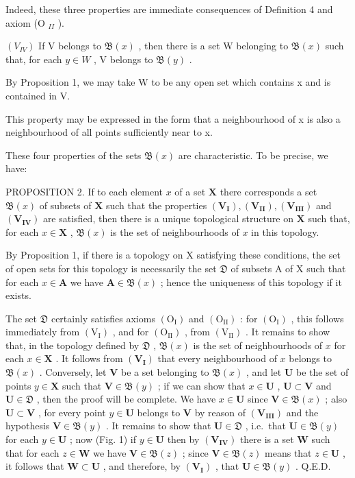 Indeed, these three properties are immediate consequences of Definition 4 and axiom (O \(_{II}\) ).

\((V_{IV})\) If V belongs to \(\mathfrak{B}(x)\) , then there is a set W belonging to \(\mathfrak{B}(x)\) such that, for each \(y \in W\) , V belongs to \(\mathfrak{B}(y)\) .

By Proposition 1, we may take W to be any open set which contains x and is contained in V.

This property may be expressed in the form that a neighbourhood of x is also a neighbourhood of all points sufficiently near to x.

These four properties of the sets \(\mathfrak{B}(x)\) are characteristic. To be precise, we have:

PROPOSITION 2. If to each element \(x\) of a set \(\mathbf{X}\) there corresponds a set \(\mathfrak{B}(x)\) of subsets of \(\mathbf{X}\) such that the properties \((\mathbf{V}_{\mathbf{I}}), (\mathbf{V}_{\mathbf{II}}), (\mathbf{V}_{\mathbf{III}})\) and \((\mathbf{V}_{\mathbf{IV}})\) are satisfied, then there is a unique topological structure on \(\mathbf{X}\) such that, for each \(x \in \mathbf{X}\) , \(\mathfrak{B}(x)\) is the set of neighbourhoods of \(x\) in this topology.

By Proposition 1, if there is a topology on X satisfying these conditions, the set of open sets for this topology is necessarily the set \(\mathfrak{D}\) of subsets A of X such that for each \(x \in \mathbf{A}\) we have \(\mathbf{A} \in \mathfrak{B}(x)\) ; hence the uniqueness of this topology if it exists.

The set \(\mathfrak{D}\) certainly satisfies axioms \((\mathrm{O_I})\) and \((\mathrm{O_{II}})\) : for \((\mathrm{O_I})\) , this follows immediately from \((\mathrm{V_I})\) , and for \((\mathrm{O_{II}})\) , from \((\mathrm{V_{II}})\) . It remains to show that, in the topology defined by \(\mathfrak{D}\) , \(\mathfrak{B}(x)\) is the set of neighbourhoods of \(x\) for each \(x \in \mathbf{X}\) . It follows from \((\mathbf{V}_{\mathbf{I}})\) that every neighbourhood of \(x\) belongs to \(\mathfrak{B}(x)\) . Conversely, let \(\mathbf{V}\) be a set belonging to \(\mathfrak{B}(x)\) , and let \(\mathbf{U}\) be the set of points \(y \in \mathbf{X}\) such that \(\mathbf{V} \in \mathfrak{B}(y)\) ; if we can show that \(x \in \mathbf{U}\) , \(\mathbf{U} \subset \mathbf{V}\) and \(\mathbf{U} \in \mathfrak{D}\) , then the proof will be complete. We have \(x \in \mathbf{U}\) since \(\mathbf{V} \in \mathfrak{B}(x)\) ; also \(\mathbf{U} \subset \mathbf{V}\) , for every point \(y \in \mathbf{U}\) belongs to \(\mathbf{V}\) by reason of \((\mathbf{V}_{\mathbf{III}})\) and the hypothesis \(\mathbf{V} \in \mathfrak{B}(y)\) . It remains to show that \(\mathbf{U} \in \mathfrak{D}\) , i.e.~that \(\mathbf{U} \in \mathfrak{B}(y)\) for each \(y \in \mathbf{U}\) ; now (Fig. 1) if \(y \in \mathbf{U}\) then by \((\mathbf{V}_{\mathbf{IV}})\) there is a set \(\mathbf{W}\) such that for each \(z \in \mathbf{W}\) we have \(\mathbf{V} \in \mathfrak{B}(z)\) ; since \(\mathbf{V} \in \mathfrak{B}(z)\) means that \(z \in \mathbf{U}\) , it follows that \(\mathbf{W} \subset \mathbf{U}\) , and therefore, by \((\mathbf{V}_{\mathbf{I}})\) , that \(\mathbf{U} \in \mathfrak{B}(y)\) . Q.E.D.

